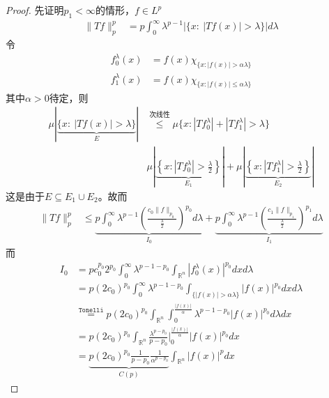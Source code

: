 \begin{proof}
    先证明$p_1<\infty$的情形，$f\in L^p$
    \begin{align*}
        \|Tf\|_p^p &= p\int_0^{\infty} \lambda^{p-1} |\{x:\ |Tf(x)| > \lambda \}| d\lambda 
    \end{align*}
    令
    \begin{align*}
        f_0^{\lambda}(x) &= f(x) \chi_{\{x: |f(x)| > \alpha\lambda \}} \\
        f_1^{\lambda}(x) &= f(x) \chi_{\{x: |f(x)| \leqslant \alpha\lambda \}}
    \end{align*}
    其中$\alpha>0$待定，则
    \begin{align*}
        \mu|\underbrace{\{x:\ |Tf(x)| > \lambda \}}\limits_{E}| &\overset{\textit{次线性}}{\leqslant} \mu\{x: |Tf_0^{\lambda}| + |Tf_1^{\lambda}| > \lambda \} \\
        & \mu|\underbrace{\left\lbrace x: |Tf_0^{\lambda}| > \frac{\lambda}{2}\right\rbrace }\limits_{E_1}| + \mu|\underbrace{\left\lbrace x: |Tf_1^{\lambda}| > \frac{\lambda}{2}\right\rbrace }\limits_{E_2}|
    \end{align*}
    这是由于$E\subseteq E_1\cup E_2$。故而
    \begin{align*}
        \|Tf\|_p^p &\leqslant \underbrace{p \int_0^{\infty} \lambda^{p-1} \left(  \frac{c_0 \|f\|_{p_0}}{\frac{\lambda}{2}}\right)^{p_0} d\lambda}\limits_{I_0} + \underbrace{p \int_0^{\infty} \lambda^{p-1} \left(  \frac{c_1 \|f\|_{p_1}}{\frac{\lambda}{2}}\right)^{p_1} d\lambda}\limits_{I_1} 
    \end{align*}
    而
    \begin{align*}
        I_0 & = p c_0^{p_0} 2^{p_0} \int_0^{\infty} \lambda^{p-1-p_0} \int_{\mathbb{R}^n} |f_0^{\lambda}(x)|^{p_0} dx d\lambda \\
        & = p (2c_0)^{p_0} \int_0^{\infty} \lambda^{p-1-p_0} \int_{\{|f(x)| > \alpha\lambda \}} |f(x)|^{p_0} dxd\lambda \\
        & \overset{\texttt{Tonelli}}{=} p(2c_0)^{p_0} \int_{\mathbb{R}^n} \int_0^{\frac{|f(x)|}{\alpha}} \lambda^{p-1-p_0} |f(x)|^{p_0} d\lambda dx \\
        & = p(2c_0)^{p_0} \int_{\mathbb{R}^n} \frac{\lambda^{p-p_0}}{p-p_0}\bigg|_{0}^{\frac{|f(x)|}{\alpha}} |f(x)|^{p_0} dx \\
        & = \underbrace{p(2c_0)^{p_0} \frac{1}{p-p_0} \frac{1}{\alpha^{p-p_0}}}\limits_{C(p)} \int_{\mathbb{R}^n} |f(x)|^p dx
    \end{align*}


\end{proof}
